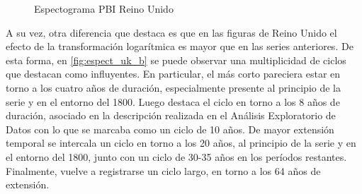 \documentclass[a4paper]{article}
\begin{document}
\begin{figure}[H]
	\centering
	\caption{Espectograma PBI Reino Unido} \label{fig:espect_uk}
\end{figure}

A su vez, otra diferencia que destaca es que en las figuras de Reino Unido el efecto de la transformación logarítmica es mayor que en las series anteriores. De esta forma, en \ref{fig:espect_uk_b} se puede observar una multiplicidad de ciclos que destacan como influyentes. En particular, el más corto pareciera estar en torno a los cuatro años de duración, especialmente presente al principio de la serie y en el entorno del 1800. Luego destaca el ciclo en torno a los 8 años de duración, asociado en la descripción realizada en el Análisis Exploratorio de Datos con lo que se marcaba como un ciclo de 10 años. De mayor extensión temporal se intercala un ciclo en torno a los 20 años, al principio de la serie y en el entorno del 1800, junto con un ciclo de 30-35 años en los períodos restantes. Finalmente, vuelve a registrarse un ciclo largo, en torno a los  64 años de extensión. 
\end{document}
